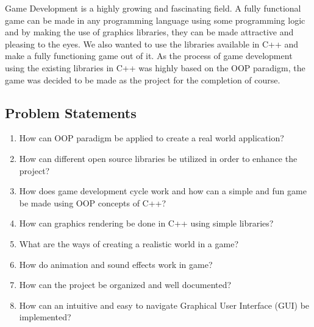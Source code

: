 \documentclass[main]{subfiles}
\begin{document}
Game Development is a highly growing and fascinating field. A fully functional game can be made in any programming language using some programming logic and by making the use of graphics libraries, they can be made attractive and pleasing to the eyes. We also wanted to use the libraries available in C++ and make a fully functioning game out of it. As the process of game development using the existing libraries in C++ was highly based on the OOP paradigm, the game was decided to be made as the project for the completion of course. 

\subsection{Problem Statements}
\begin{enumerate}
    \item How can OOP paradigm be applied to create a real world application?
    
    \item How can different open source libraries be utilized in order to enhance the project?
    
    \item How does game development cycle work and how can a simple and fun game be made using OOP concepts of C++?
    
    \item How can graphics rendering be done in C++ using simple libraries?
    
    \item What are the ways of creating a realistic world in a game?
    
    \item How do animation and sound effects work in game?
    
    \item How can the project be organized and well documented?
    
    \item How can an intuitive and easy to navigate Graphical User Interface (GUI) be implemented?
\end{enumerate}
\end{document}
